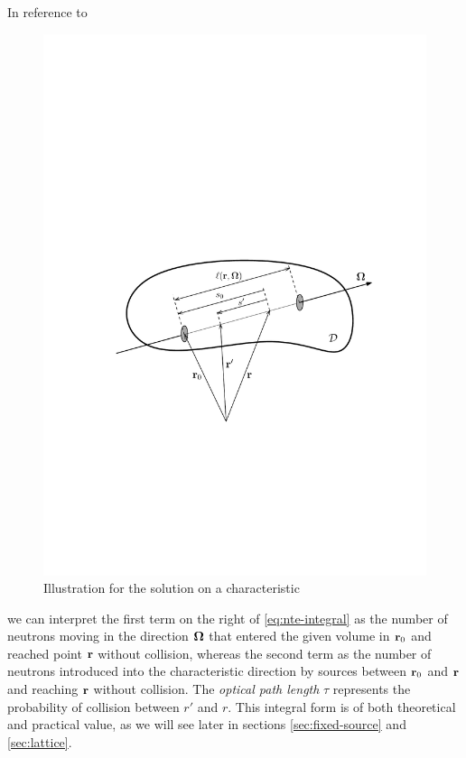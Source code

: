In reference to 
\begin{figure}[tbp]
\begin{center}
  \includegraphics[scale=.75]{trepka}
  \caption{Illustration for the solution on a characteristic}
  \label{fig:trepka}
\end{center}
\end{figure}
we can interpret the first term on the right of \eqref{eq:nte-integral} as the number of
neutrons moving in the direction $\mathbf{\Omega}$ that entered the given volume in $\mathbf{r}_0$ and reached point $\mathbf{r}$ without
collision, whereas the second term as the number of neutrons introduced into the characteristic direction by sources 
between $\mathbf{r}_0$ and $\mathbf{r}$ and reaching $\mathbf{r}$ without collision. The \textit{optical path length} $\tau$ represents the 
probability of collision between $r'$ and $r$. This integral form is of both theoretical and practical value, as we will
see later in sections \ref{sec:fixed-source} and \ref{sec:lattice}.

